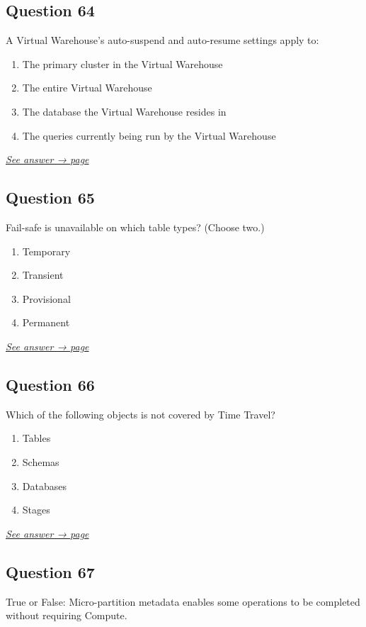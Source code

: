 \documentclass[12pt]{article}
\newcommand{\seeanswer}[1]{%
  \par\smallskip\emph{\hyperref[ans:#1]{See answer → page \pageref{ans:#1}}}%
}
\begin{document}
\subsection*{Question 64}\label{q:64}
A Virtual Warehouse's auto-suspend and auto-resume settings apply to:

\begin{enumerate}[label=\Alph*.]
  \item The primary cluster in the Virtual Warehouse
  \item The entire Virtual Warehouse
  \item The database the Virtual Warehouse resides in
  \item The queries currently being run by the Virtual Warehouse
\end{enumerate}
\seeanswer{64}

\subsection*{Question 65}\label{q:65}
Fail-safe is unavailable on which table types? (Choose two.)

\begin{enumerate}[label=\Alph*.]
  \item Temporary
  \item Transient
  \item Provisional
  \item Permanent
\end{enumerate}
\seeanswer{65}

\subsection*{Question 66}\label{q:66}
Which of the following objects is not covered by Time Travel?

\begin{enumerate}[label=\Alph*.]
  \item Tables
  \item Schemas
  \item Databases
  \item Stages
\end{enumerate}
\seeanswer{66}

\subsection*{Question 67}\label{q:67}
True or False: Micro-partition metadata enables some operations to be completed without requiring Compute.
\end{document}
